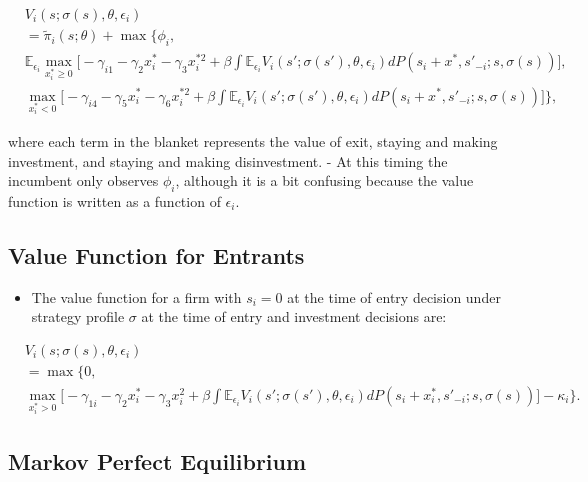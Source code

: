 \documentclass[]{book}
\providecommand{\tightlist}{%
  \setlength{\itemsep}{0pt}\setlength{\parskip}{0pt}}
\begin{document}
\begin{equation}
\begin{split}
&V_i(s; \sigma(s), \theta, \epsilon_i)\\
&=\tilde{\pi}_i(s; \theta) + \max\Bigg\{\phi_i,\\
& \mathbb{E}_{\epsilon_i}\max_{x_i^* \ge 0}  \Bigg[ - \gamma_{i1} - \gamma_{2} x_i^* - \gamma_3 x_i^{*2} + \beta \int \mathbb{E}_{\epsilon_i} V_i(s'; \sigma(s'), \theta, \epsilon_i) dP(s_i + x^*, s'_{-i}; s, \sigma(s))\Bigg],\\
&\max_{x_i^* < 0} \Bigg[- \gamma_{i4} - \gamma_5 x_i^* - \gamma_6 x_i^{*2} + \beta \int \mathbb{E}_{\epsilon_i} V_i(s'; \sigma(s'), \theta, \epsilon_i) dP(s_i + x^*, s'_{-i}; s, \sigma(s))  \Bigg]\Bigg\},
\end{split}
\end{equation}

where each term in the blanket represents the value of exit, staying and
making investment, and staying and making disinvestment. - At this
timing the incumbent only observes \(\phi_i\), although it is a bit
confusing because the value function is written as a function of
\(\epsilon_i\).

\subsection{Value Function for
Entrants}\label{value-function-for-entrants}

\begin{itemize}
\tightlist
\item
  The value function for a firm with \(s_i = 0\) at the time of entry
  decision under strategy profile \(\sigma\) at the time of entry and
  investment decisions are:
\end{itemize}

\begin{equation}
\begin{split}
&V_i(s; \sigma(s), \theta, \epsilon_i)\\
&=\max\Bigg\{0, \\
&\max_{x_i^* > 0} \Bigg[ - \gamma_{1i} - \gamma_2 x_i^* - \gamma_3 x_i^2 + \beta \int \mathbb{E}_{\epsilon_i} V_i(s'; \sigma(s'), \theta, \epsilon_i) dP(s_i + x_i^*, s'_{-i}; s, \sigma(s))\Bigg] - \kappa_i\Bigg\}.
\end{split}
\end{equation}

\subsection{Markov Perfect
Equilibrium}\label{markov-perfect-equilibrium-1}
\end{document}
